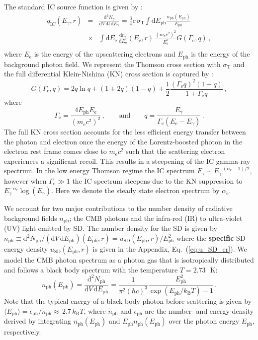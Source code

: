 \documentclass[10pt,aps,pra,reprint,amsmath,amsfonts,amssymb,showpacs,nofootinbib,floatfix]{revtex4-1}
\def\C#1{{\bf #1}}
\newcommand{\rmn}{\mathrm}
\newcommand{\ph}{\rmn{ph}}
\newcommand{\eph}{E_\ph}
\newcommand{\sd}{\rmn{SD}}
\newcommand{\ee}{E_\rmn{e}}
\newcommand{\B}{\rmn{B}}
\newcommand{\dd}{\rmn{d}}
\newcommand{\e}{\rmn{e}}
\newcommand{\eg}{E_\gamma}
\begin{document}
The standard IC source function is given by
\cite{1979rpa..book.....R}:
\begin{eqnarray}
  q_{\rmn IC}(\eg, r) &=&  \frac{\dd^3 N_\gamma}{\dd V\,\dd t\,\dd \eg} = 
 \frac{3}{4}c\,\sigma_\rmn{T}
\int\dd \eph \frac{n_\rmn{ph}(\eph)}{\eph}\nonumber\\
&\times& \int \dd \ee\,\frac{\dd n_\e}{\dd \ee}(\ee,r)\,
 \frac{\left(m_\e c^2\right)^2}{\ee^2}G(\Gamma_\e,q)\,,\nonumber\\
  \label{eq:ICemiss}
\end{eqnarray}
where $\ee$ is the energy of the upscattering electrons and $\eph$ is
the energy of the background photon field. We represent the Thomson
cross section with $\sigma_\rmn{T}$ and the full differential
Klein-Nishina (KN) cross section is captured by
\cite{1970RvMP...42..237B}:
\begin{equation}
\label{eq:KN_spec}
G(\Gamma_\e,q) = 2q\ln{q}+(1+2q)(1-q)+ 
\frac{1}{2}\frac{\left(\Gamma_\e q\right)^2\left(1-q\right)}
     {1+\Gamma_\e q}\,,
\end{equation}
where
\begin{equation}
\Gamma_\e=\frac{4\eph \ee}{\left(m_\e c^2\right)^2}\,,\qquad \rmn{and} \qquad  
q=\frac{\eg}{\Gamma_\e\left(\ee-\eg\right)}\,.
\end{equation}
The full KN cross section accounts for the less efficient energy
transfer between the photon and electron once the energy of the
Lorentz-boosted photon in the electron rest frame comes close to $m_\e
c^2$ such that the scattering electron experiences a significant
recoil. This results in a steepening of the IC gamma-ray spectrum. In
the low energy Thomson regime the IC spectrum $F_\gamma\sim
E_\gamma^{-(\alpha_\e-1)/2}$, however when $\Gamma_\e \gg 1$ the IC
spectrum steepens due to the KN suppression to
$\eg^{-\alpha_\e}\log(\eg)$. Here we denote the steady state electron
spectrum by $\alpha_\e$.

We account for two major contributions to the number density of
radiative background fields $n_\ph$; the CMB photons and the infra-red
(IR) to ultra-violet (UV) light emitted by SD. The number density for
the SD is given by $n_\ph\equiv\dd^2 N_\ph/ (\dd V \,\dd \eph)
(\eph,r)= u_\sd(\eph,r) /\eph^2$ where the \C{specific} SD energy
density $u_\sd(\eph,r)$ is given in the Appendix,
Eq.~(\ref{eq:u_SD_er}). We model the CMB photon spectrum as a photon
gas that is isotropically distributed and follows a black body
spectrum with the temperature $T=2.73\,$~K:
\begin{equation}
\label{eq:photon_gas}
  n_\rmn{ph}(\eph) = \frac{\dd^2 N_\ph}{\dd V \,\dd \eph} =
  \frac{1}{\pi^2(\hbar c)^3}\frac{\eph^2}{\exp(\eph/k_\B T)-1}\,.
\end{equation}
Note that the typical energy of a black body photon before scattering
is given by $\langle\eph\rangle=\epsilon_\ph/\tilde{n}_\ph\approx\,2.7\, k_\B T$,
where $\tilde{n}_\ph$ and $\epsilon_\ph$ are the number- and
energy-density derived by integrating $n_\ph(\eph)$ and $\eph
n_\ph(\eph)$ over the photon energy $\eph$, respectively.
\end{document}
